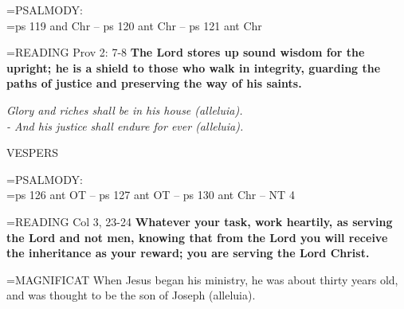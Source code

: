 \hangindent=\parindent \small{PSALMODY:}\\
\hangindent=\parindent  ps 119 and Chr -- ps 120 ant Chr -- ps 121 ant Chr\vspace{0.5em}

\hangindent=\parindent \small{READING} Prov 2: 7-8 \textbf{The Lord stores up sound wisdom for the upright;
he is a shield to those who walk in integrity, guarding the paths of
justice and preserving the way of his saints.}
 
\begin{center}
\textit{Glory and riches shall be in his house (alleluia).\\
- And his justice shall endure for ever (alleluia).}
\end{center}

\begin{flushleft}\normalsize VESPERS\\\end{flushleft}

\hangindent=\parindent \small{PSALMODY:}\\
\hangindent=\parindent  ps 126 ant OT -- ps 127 ant OT -- ps 130 ant Chr -- NT 4\vspace{0.5em}

\hangindent=\parindent \small{READING} Col 3, 23-24 \textbf{Whatever your task, work heartily, as serving
the Lord and not men, knowing that from the Lord you will receive
the inheritance as your reward; you are serving the Lord Christ.\\}
 
\hangindent=\parindent \small{MAGNIFICAT  When Jesus began his ministry, he was about thirty years
old, and was thought to be the son of Joseph (alleluia).\\}
 
